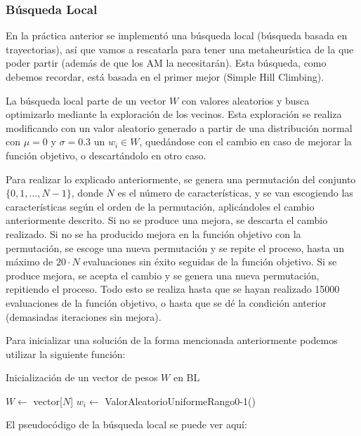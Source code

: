 \documentclass[11pt,a4paper]{article}
\begin{document}
\subsubsection{Búsqueda Local}

En la práctica anterior se implementó una búsqueda local (búsqueda basada en trayectorias), así que vamos a rescatarla para
tener una metaheurística de la que poder partir (además de que los AM la necesitarán). Esta búsqueda, como debemos recordar, está basada en el primer mejor (Simple
Hill Climbing).

La búsqueda local parte de un vector $W$ con valores aleatorios y busca optimizarlo mediante la exploración de los vecinos.
Esta exploración se realiza modificando con un valor aleatorio generado a partir de una distribución normal con $\mu = 0$ y 
$\sigma = 0.3$ un $w_i \in W$, quedándose con el cambio en caso de mejorar la función objetivo, o descartándolo en otro caso.

Para realizar lo explicado anteriormente, se genera una permutación del conjunto $\lbrace 0, 1, \dots , N-1 \rbrace$, donde $N$
es el número de características, y se van escogiendo las características según el orden de la permutación, aplicándoles
el cambio anteriormente descrito. Si no se produce una mejora, se descarta el cambio realizado. Si no se ha producido mejora
en la función objetivo con la permutación, se escoge una nueva permutación y se repite el proceso, hasta un máximo de $20
\cdot N$ evaluaciones sin éxito seguidas de la función objetivo. Si se produce mejora, se acepta el cambio y se genera una
nueva permutación, repitiendo el proceso. Todo esto se realiza hasta que se hayan realizado 15000 evaluaciones de la función
objetivo, o hasta que se dé la condición anterior (demasiadas iteraciones sin mejora).

Para inicializar una solución de la forma mencionada anteriormente podemos utilizar la siguiente función:

\begin{algorithm}[H]
\caption{Inicialización de un vector de pesos $W$ en BL}
\begin{algorithmic}[1]
\State$W \gets$ vector[$N$]
	 \State $w_i \gets$ ValorAleatorioUniformeRango0-1()
\EndFor
\State {}
\EndFunction
\end{algorithmic}
\end{algorithm}

El pseudocódigo de la búsqueda local se puede ver aquí:
\end{document}

